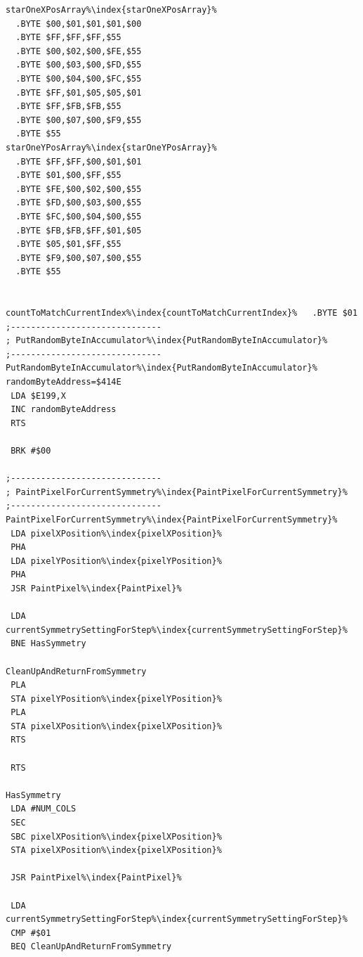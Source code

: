 \begin{minipage}[b]{0.33\linewidth}
\begin{lrbox}{\mybox}%
\begin{lstlisting}[basicstyle=\ttfamily\tiny,escapechar=\%]
starOneXPosArray%\index{starOneXPosArray}%  
  .BYTE $00,$01,$01,$01,$00
  .BYTE $FF,$FF,$FF,$55 
  .BYTE $00,$02,$00,$FE,$55                 
  .BYTE $00,$03,$00,$FD,$55                 
  .BYTE $00,$04,$00,$FC,$55                 
  .BYTE $FF,$01,$05,$05,$01
  .BYTE $FF,$FB,$FB,$55 
  .BYTE $00,$07,$00,$F9,$55                 
  .BYTE $55                                 
starOneYPosArray%\index{starOneYPosArray}%  
  .BYTE $FF,$FF,$00,$01,$01
  .BYTE $01,$00,$FF,$55 
  .BYTE $FE,$00,$02,$00,$55                 
  .BYTE $FD,$00,$03,$00,$55                 
  .BYTE $FC,$00,$04,$00,$55                 
  .BYTE $FB,$FB,$FF,$01,$05
  .BYTE $05,$01,$FF,$55 
  .BYTE $F9,$00,$07,$00,$55                 
  .BYTE $55                                 
                                            

countToMatchCurrentIndex%\index{countToMatchCurrentIndex}%   .BYTE $01
;------------------------------
; PutRandomByteInAccumulator%\index{PutRandomByteInAccumulator}%
;------------------------------
PutRandomByteInAccumulator%\index{PutRandomByteInAccumulator}%   
randomByteAddress=$414E
 LDA $E199,X
 INC randomByteAddress
 RTS 

 BRK #$00

;------------------------------
; PaintPixelForCurrentSymmetry%\index{PaintPixelForCurrentSymmetry}%
;------------------------------
PaintPixelForCurrentSymmetry%\index{PaintPixelForCurrentSymmetry}%   
 LDA pixelXPosition%\index{pixelXPosition}%
 PHA 
 LDA pixelYPosition%\index{pixelYPosition}%
 PHA 
 JSR PaintPixel%\index{PaintPixel}%

 LDA currentSymmetrySettingForStep%\index{currentSymmetrySettingForStep}%
 BNE HasSymmetry

CleanUpAndReturnFromSymmetry   
 PLA 
 STA pixelYPosition%\index{pixelYPosition}%
 PLA 
 STA pixelXPosition%\index{pixelXPosition}%
 RTS 

 RTS 

HasSymmetry   
 LDA #NUM_COLS
 SEC 
 SBC pixelXPosition%\index{pixelXPosition}%
 STA pixelXPosition%\index{pixelXPosition}%

 JSR PaintPixel%\index{PaintPixel}%

 LDA currentSymmetrySettingForStep%\index{currentSymmetrySettingForStep}%
 CMP #$01
 BEQ CleanUpAndReturnFromSymmetry


\end{lstlisting}
\end{lrbox}
\end{minipage}
